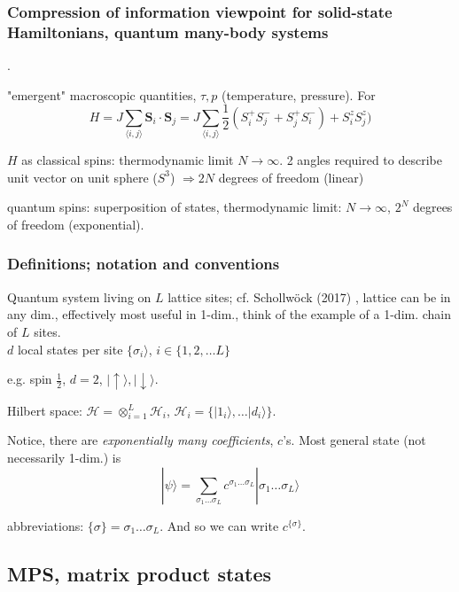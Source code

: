\subsubsection{Compression of information viewpoint for solid-state Hamiltonians, quantum many-body systems}.

"emergent" macroscopic quantities, $\tau, p$ (temperature, pressure). For 
\[
	H = J \sum_{ \langle i , j \rangle } \mathbf{S}_i \cdot \mathbf{S}_j = J \sum_{ \langle i, j \rangle } \frac{1}{2} (S_i^{+} S_j^- + S_j^{+} S_i^-) + S_i^z S_j^z  )
\]

$H$ as classical spins: thermodynamic limit $N \to \infty$. 2 angles required to describe unit vector on unit sphere ($S^3$) $\Longrightarrow 2N $ degrees of freedom (linear)

quantum spins: superposition of states, thermodynamic limit: $N \to \infty$, $2^N$ degrees of freedom (exponential).

\subsubsection{Definitions; notation and conventions}

Quantum system living on $L$ lattice sites; cf. Schollw\"{o}ck (2017) \cite{agat:ArSo2017}, lattice can be in any dim., effectively most useful in 1-dim., think of the example of a 1-dim. chain of $L$ sites. \\

$d$ local states per site $\lbrace \sigma_i \rangle$, $i \in \lbrace 1,2, \dots L\rbrace$

e.g. spin $\frac{1}{2}$, $d=2$, $| \uparrow \rangle, | \downarrow \rangle$.

Hilbert space: $\mathcal{H} = \otimes_{i=1}^L \mathcal{H}_i$, $\mathcal{H}_i = \lbrace | 1_i \rangle , \dots | d_i \rangle \rbrace$. 

Notice, there are \emph{exponentially many coefficients}, $c$'s. Most general state (not necessarily 1-dim.) is 
\begin{equation}
|\psi \rangle = \sum_{\sigma_1 \dots \sigma_L} c^{\sigma_1 \dots \sigma_L} | \sigma_1 \dots \sigma_L \rangle
\end{equation}

abbreviations: $\lbrace \sigma \rbrace = \sigma_1 \dots \sigma_L$. And so we can write $c^{\lbrace \sigma \rbrace}$. 

\subsection{MPS, matrix product states}

